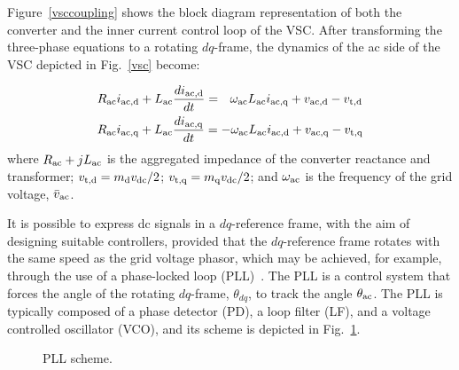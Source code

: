 \documentclass[journal, a4paper]{IEEEtran}
\begin{document}
Figure~\ref{vsccoupling} shows the block diagram representation of both the converter
and the inner current control loop of the VSC. 
After transforming the three-phase equations to a rotating $dq$-frame, 
the dynamics of the ac side of the VSC depicted in Fig.~\ref{vsc} become:

\begin{equation}
  \begin{array}{lll}
		R_{\rm ac} i_{\rm ac,d} + L_{\rm ac} \dfrac{d i_{\rm ac,d}}{dt} = 
		\hspace*{0.24cm}\omega_{\rm ac} L_{\rm ac} i_{\rm ac, q} + v_{\rm ac, d} \vspace*{0.15cm}  - v_{\rm t,d}\\ 
		R_{\rm ac} i_{\rm ac,q} + L_{\rm ac} \dfrac{d i_{\rm ac,q}}{dt} = 
	 -\omega_{\rm ac} L_{\rm ac} i_{\rm ac, d} + v_{\rm ac, q} - v_{\rm t,q}
  \end{array}
  \label{acvsc}
\end{equation}
where $R_{\rm ac} + jL_{\rm ac}$ is the aggregated impedance of the converter reactance
and transformer; $v_{\rm t,d} = m_{\rm d} v_{\rm dc}/2$;
$v_{\rm t,q} = m_{\rm q} v_{\rm dc}/2$; and $\omega_{\rm ac}$ is the frequency of the grid 
voltage, $\bar{v}_{\rm ac}$. 

It is possible to express dc signals in a $dq$-reference frame, with the aim of
designing suitable controllers, provided that the $dq$-reference frame rotates
with the same speed as the grid voltage phasor, which may be achieved, for
example, through the use of a phase-locked loop (PLL)~\cite{Cole:2010}.
The PLL is a control system that forces the angle of the rotating $dq$-frame, 
$\theta_{dq}$, to track the angle $\theta_{\rm ac}$. The
PLL is typically composed of a phase detector (PD), a loop filter (LF), and
a voltage controlled oscillator (VCO), and its scheme is depicted in Fig.~\ref{pll}.
 \begin{figure}[h!]
  \begin{center}
    \psfrag{-}{\small{$-$}}
    \caption{PLL scheme.}
    \label{pll}
  \end{center}
  \vspace{-0.4cm}
\end{figure}
\end{document}
